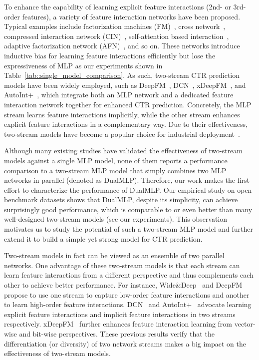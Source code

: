\documentclass[letterpaper]{article} \usepackage{aaai23}  \usepackage{times}  \usepackage{helvet}  \usepackage{courier}  \usepackage[hyphens]{url}  \usepackage{graphicx} \urlstyle{rm} \def\UrlFont{\rm}  \usepackage{natbib}  \usepackage{caption} \frenchspacing  \setlength{\pdfpagewidth}{8.5in}  \setlength{\pdfpageheight}{11in}  \usepackage{algorithm}
\begin{document}
To enhance the capability of learning explicit feature interactions (2nd- or 3rd-order features), a variety of feature interaction networks have been proposed. Typical examples include factorization machines (FM)~\cite{FM}, cross network~\cite{DCN}, compressed interaction network (CIN)~\cite{xDeepFM}, self-attention based interaction~\cite{autoint}, adaptive factorization network (AFN)~\cite{AFN}, and so on. These networks introduce inductive bias for learning feature interactions efficiently but lose the expressiveness of MLP as our experiments shown in Table~\ref{tab::single_model_comparison}. As such, two-stream CTR prediction models have been widely employed, such as DeepFM~\cite{DeepFM}, DCN~\cite{DCN}, xDeepFM~\cite{xDeepFM}, and AutoInt+~\cite{autoint}, which integrate both an MLP network and a dedicated feature interaction network together for enhanced CTR prediction. Concretely, the MLP stream learns feature interactions implicitly, while the other stream enhances explicit feature interactions in a complementary way. Due to their effectiveness, two-stream models have become a popular choice for industrial deployment~\cite{CTR_Survey}.

Although many existing studies have validated the effectiveness of two-stream models against a single MLP model, none of them reports a performance comparison to a two-stream MLP model that simply combines two MLP networks in parallel (denoted as DualMLP). Therefore, our work makes the first effort to characterize the performance of DualMLP. Our empirical study on open benchmark datasets shows that DualMLP, despite its simplicity, can achieve surprisingly good performance, which is comparable to or even better than many well-designed two-stream models (see our experiments). This observation motivates us to study the potential of such a two-stream MLP model and further extend it to build a simple yet strong model for CTR prediction.

Two-stream models in fact can be viewed as an ensemble of two parallel networks. One advantage of these two-stream models is that each stream can learn feature interactions from a different perspective and thus complements each other to achieve better performance. For instance, Wide\&Deep~\cite{WideDeep} and
DeepFM~\cite{DeepFM} propose to use one stream to capture low-order feature interactions and another to learn high-order feature interactions. DCN~\cite{DCN} and AutoInt+~\cite{autoint} advocate learning explicit feature interactions and implicit feature interactions in two streams respectively. xDeepFM~\cite{xDeepFM} further enhances feature interaction learning from vector-wise and bit-wise perspectives. These previous results verify that the differentiation (or diversity) of two network streams makes a big impact on the effectiveness of two-stream models.
\end{document}
